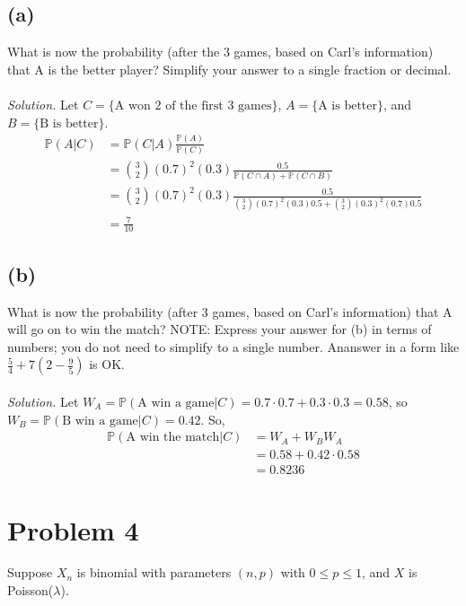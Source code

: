 \documentclass{article}
\newcommand{\prob}{\mathbb{P}}
\begin{document}
\subsection*{(a)}
What is now the probability (after the 3 games, based on Carl's information) that A is the better player? Simplify your answer to a single fraction or decimal.
\color{blue}
\\\\\textit{Solution.} Let $C=\{\text{A won 2 of the first 3 games}\}$, $A=\{\text{A is better}\}$, and $B=\{\text{B is better}\}$.
\begin{equation*}
    \begin{split}
        \prob(A\vert C) &= \prob(C\vert A)\frac{\prob(A)}{\prob(C)}\\
        &= {3 \choose 2} (0.7)^2(0.3) \frac{0.5}{\prob(C \cap A)+\prob(C\cap B)}\\
        &= {3 \choose 2} (0.7)^2(0.3) \frac{0.5}{{3 \choose 2} (0.7)^2(0.3)0.5+{3 \choose 2} (0.3)^2(0.7)0.5}\\
        &= \frac{7}{10}
    \end{split}
\end{equation*}
\color{black}
\subsection*{(b)}
What is now the probability (after 3 games, based on Carl's information) that A will go on to win the match? NOTE: Express your answer for (b) in terms of numbers; you do not need to simplify to a single number. Ananswer in a form like $\frac{5}{4}+7(2-\frac{9}{5})$ is OK.
\color{blue}
\\\\\textit{Solution. }Let $W_A=\prob(\text{A win a game}\vert C) = 0.7\cdot 0.7+0.3\cdot 0.3 = 0.58$, so $W_B=\prob(\text{B win a game}\vert C)=0.42$. So,
\begin{equation*}
    \begin{split}
        \prob(\text{A win the match}\vert C) &= W_A+W_BW_A\\
        &=0.58+0.42\cdot 0.58\\
        &= 0.8236
    \end{split}
\end{equation*}
\color{black}

\section*{Problem 4}
Suppose $X_n$ is binomial with parameters $(n,p)$ with $0\leq p\leq 1$, and $ X$ is Poisson($\lambda$).
\end{document}

